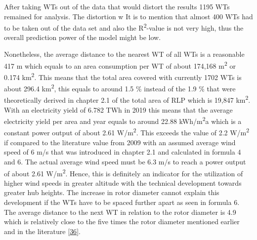 \documentclass[a4paper,11pt]{article}
\begin{document}
After taking WTs out of the data that would distort the results 1195 WTs remained for analysis. The distortion w It is to mention that almost 400 WTs had to be taken out of the data set and also the R\textsuperscript{2}-value is not very high, thus the overall prediction power of the model might be low.

Nonetheless, the average distance to the nearest WT of all WTs is a reasonable 417 m which equals to an area consumption per WT of about 174,168 m\textsuperscript{2} or 0.174 km\textsuperscript{2}. This means that the total area covered with currently 1702 WTs is about 296.4 km\textsuperscript{2}, this equals to around 1.5 \% instead of the 1.9 \% that were theoretically derived in chapter 2.1 of the total area of RLP which is 19,847 km\textsuperscript{2}. With an electricity yield of 6.782 TWh in 2019 this means that the average electricity yield per area and year equals to around 22.88 kWh/m\textsuperscript{2}a which is a constant power output of about 2.61 W/m\textsuperscript{2}. This exceeds the value of 2.2 W/m\textsuperscript{2} if compared to the literature value from 2009 with an assumed average wind speed of 6 m/s that was introduced in chapter 2.1 and calculated in formula 4 and 6. The actual average wind speed must be 6.3 m/s to reach a power output of about 2.61 W/m\textsuperscript{2}. Hence, this is definitely an indicator for the utilization of higher wind speeds in greater altitude with the technical development towards greater hub heights. The increase in rotor diameter cannot explain this development if the WTs have to be spaced further apart as seen in formula 6. The average distance to the next WT in relation to the rotor diameter is 4.9 which is relatively close to the five times the rotor diameter mentioned earlier and in the literature {[}\protect\hyperlink{ref-DavidJCMacKay.2009}{36}{]}.
\end{document}
